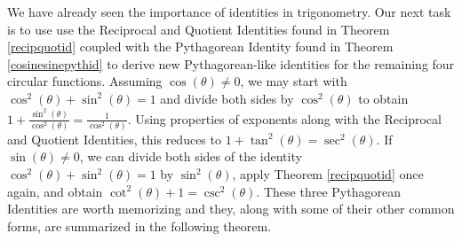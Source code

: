 {\begin{enumerate}

\end{enumerate}
}

\medskip

We have already seen the importance of identities in trigonometry.  Our next task is to use use the Reciprocal and Quotient Identities found in Theorem \ref{recipquotid} coupled with the Pythagorean Identity found in Theorem \ref{cosinesinepythid} to derive new Pythagorean-like identities for the remaining four circular functions.   Assuming $\cos(\theta) \neq 0$, we may start with $\cos^{2}(\theta) + \sin^{2}(\theta) = 1$ and divide both sides by $\cos^{2}(\theta)$ to obtain $1 + \frac{\sin^{2}(\theta)}{\cos^{2}(\theta)} = \frac{1}{\cos^{2}(\theta)}$.  Using properties of exponents along with the Reciprocal and Quotient Identities, this reduces to $1 + \tan^{2}(\theta) = \sec^{2}(\theta)$.  If $\sin(\theta) \neq 0$, we can divide both sides of the identity $\cos^{2}(\theta) + \sin^{2}(\theta) = 1$ by $\sin^{2}(\theta)$, apply Theorem \ref{recipquotid} once again,  and obtain $\cot^{2}(\theta) + 1 = \csc^{2}(\theta)$.  These three Pythagorean Identities are worth memorizing and they, along with some of their other common forms, are summarized in the following theorem.

\smallskip

